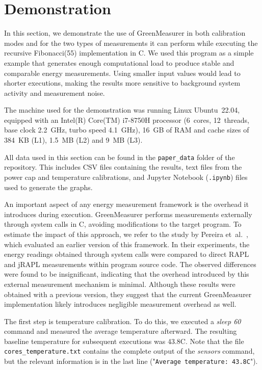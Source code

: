 \section{Demonstration}
\label{demo_section}

In this section, we demonstrate the use of GreenMeasurer in both calibration modes and for the two types of measurements it can perform while executing the recursive Fibonacci(55) implementation in C. We used this program as a simple example that generates enough computational load to produce stable and comparable energy measurements. Using smaller input values would lead to shorter executions, making the results more sensitive to background system activity and measurement noise.

The machine used for the demonstration was running Linux Ubuntu~22.04, equipped with an Intel(R) Core(TM) i7-8750H processor (6~cores, 12~threads, base clock 2.2~GHz, turbo speed 4.1~GHz), 16~GB of RAM and cache sizes of 384~KB (L1), 1.5~MB (L2) and 9~MB (L3).

All data used in this section can be found in the \texttt{paper\_data} folder of the repository. This includes CSV files containing the results, text files from the power cap and temperature calibrations, and Jupyter Notebook (\texttt{.ipynb}) files used to generate the graphs.

An important aspect of any energy measurement framework is the overhead it introduces during execution. GreenMeasurer performs measurements externally through system calls in C, avoiding modifications to the target program. To estimate the impact of this approach, we refer to the study by Pereira et~al.~\cite{PEREIRA2021102609}, which evaluated an earlier version of this framework. In their experiments, the energy readings obtained through system calls were compared to direct RAPL and jRAPL measurements within program source code. The observed differences were found to be insignificant, indicating that the overhead introduced by this external measurement mechanism is minimal. Although these results were obtained with a previous version, they suggest that the current GreenMeasurer implementation likely introduces negligible measurement overhead as well.


The first step is temperature calibration. To do this, we executed a \textit{sleep 60} command and measured the average temperature afterward. The resulting baseline temperature for subsequent executions was 43.8\textdegree C. Note that the file \texttt{cores\_temperature.txt} contains the complete output of the \textit{sensors} command, but the relevant information is in the last line ("\texttt{Average temperature: 43.8\textdegree C}").

